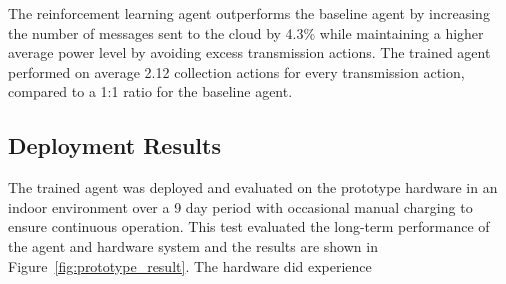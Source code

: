 \documentclass[10pt]{cai}
\begin{document}
The reinforcement learning agent outperforms the baseline agent by increasing the number of messages sent to the cloud by 4.3\% while maintaining a higher average power level by avoiding excess transmission actions.
The trained agent performed on average 2.12 collection actions for every transmission action, compared to a 1:1 ratio for the baseline agent.

\subsection{Deployment Results}

The trained agent was deployed and evaluated on the prototype hardware in an indoor environment over a 9 day period with occasional manual charging to ensure continuous operation.
This test evaluated the long-term performance of the agent and hardware system and the results are shown in Figure~\ref{fig:prototype_result}.
The hardware did experience 
\end{document}
